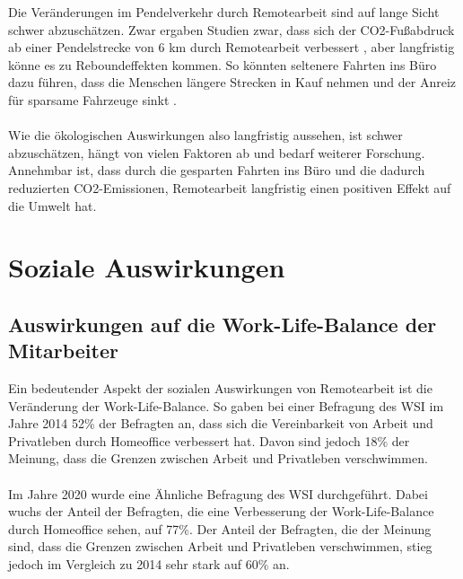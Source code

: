 \documentclass[runningheads]{llncs}
\begin{document}
Die Veränderungen im Pendelverkehr durch Remotearbeit sind auf lange Sicht schwer abzuschätzen.
Zwar ergaben Studien zwar, dass sich der CO2-Fußabdruck ab einer Pendelstrecke von 6 km durch Remotearbeit verbessert \cite{daniel_crow_working_2022}, aber langfristig könne es zu Reboundeffekten kommen.
So könnten seltenere Fahrten ins Büro dazu führen, dass die Menschen längere Strecken in Kauf nehmen und der Anreiz für sparsame Fahrzeuge sinkt \cite{waldemar_marz_reduziert_2022}.\\\\
Wie die ökologischen Auswirkungen also langfristig aussehen, ist schwer abzuschätzen, hängt von vielen Faktoren ab und bedarf weiterer Forschung.
Annehmbar ist, dass durch die gesparten Fahrten ins Büro und die dadurch reduzierten CO2-Emissionen, Remotearbeit langfristig einen positiven Effekt auf die Umwelt hat.

\section{Soziale Auswirkungen}

\subsection{Auswirkungen auf die Work-Life-Balance der Mitarbeiter}

Ein bedeutender Aspekt der sozialen Auswirkungen von Remotearbeit ist die Veränderung der Work-Life-Balance. So gaben bei einer Befragung des WSI im Jahre 2014 52\% der Befragten an, dass sich die Vereinbarkeit von Arbeit und Privatleben durch Homeoffice verbessert hat. Davon sind jedoch 18\% der Meinung, dass die Grenzen zwischen Arbeit und Privatleben verschwimmen. \cite{wsi_wsi_2014}
\\\\
Im Jahre 2020 wurde eine Ähnliche Befragung des WSI durchgeführt. Dabei wuchs der Anteil der Befragten, die eine Verbesserung der Work-Life-Balance durch Homeoffice sehen, auf 77\%. Der Anteil der Befragten, die der Meinung sind, dass die Grenzen zwischen Arbeit und Privatleben verschwimmen, stieg jedoch im Vergleich zu 2014 sehr stark auf 60\% an. \cite{wsi_homeoffice_2020}

\end{document}
